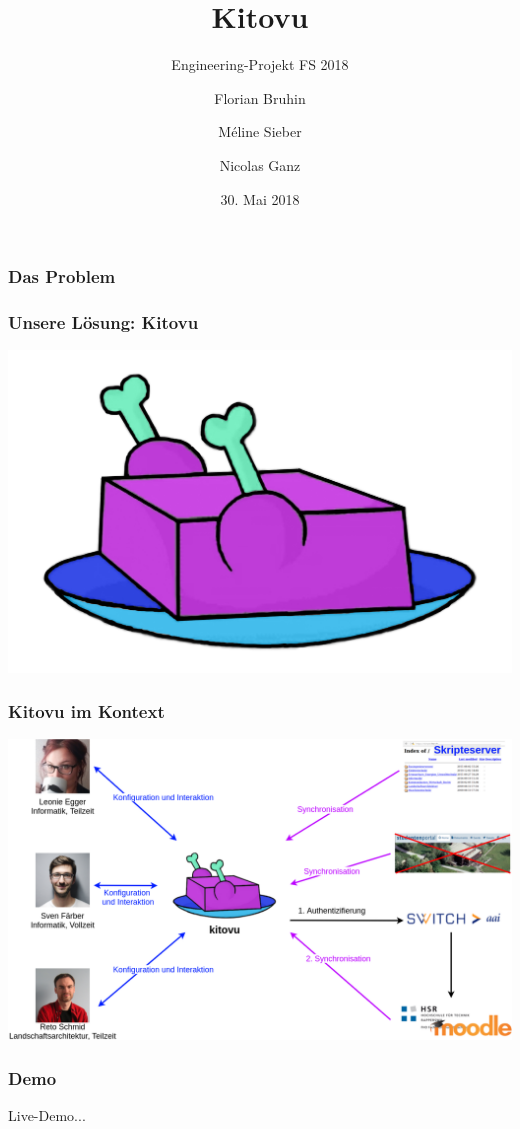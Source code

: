\documentclass{beamer}
\title{Kitovu %
}
\subtitle{Engineering-Projekt FS 2018}
\author{Florian Bruhin \and Méline Sieber \and Nicolas Ganz}
\institute{HSR Hochschule für Technik Rapperswil}
\date{30. Mai 2018}
\begin{document}
  \frame{\titlepage}

  \begin{frame}
    \frametitle{Das Problem}
  \end{frame} 

  \begin{frame}
    \frametitle{Unsere Lösung: Kitovu}
    \begin{center}
    \includegraphics[width=0.5\linewidth]{../../img/logo/kitovu.jpg}
    \end{center}
  \end{frame} 

  \begin{frame}
    \frametitle{Kitovu im Kontext}
    \includegraphics[width=\linewidth]{../03_End_of_Elaboration/img/kontextdiagramm.png}
  \end{frame}

  \begin{frame}
    \frametitle{Demo}
    Live-Demo...
  \end{frame}
\end{document}
